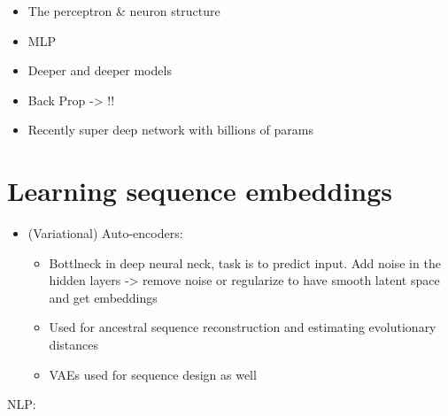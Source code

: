 \documentclass[
  11pt,
  twoside,
  BCOR=10mm,
  listof=totoc]{scrbook}
\providecommand{\tightlist}{%
  \setlength{\itemsep}{0pt}\setlength{\parskip}{0pt}}
\begin{document}
\begin{itemize}
\item
  The perceptron \& neuron structure
\item
  MLP
\item
  Deeper and deeper models
\item
  Back Prop -\textgreater{} !!
\item
  Recently super deep network with billions of params
\end{itemize}

\hypertarget{learning-sequence-embeddings}{%
\section{Learning sequence embeddings}\label{learning-sequence-embeddings}}

\begin{itemize}
\item
  (Variational) Auto-encoders:

  \begin{itemize}
  \tightlist
  \item
    Bottlneck in deep neural neck, task is to predict input. Add noise in the hidden layers -\textgreater{} remove noise or regularize to have smooth latent space and get embeddings
  \item
    Used for ancestral sequence reconstruction \autocite{moretaAncestralProteinSequence2022} and estimating evolutionary distances \autocite{corsoNeuralDistanceEmbeddings2021}
  \item
    VAEs used for sequence design as well \autocite{wuProteinSequenceDesign2021,stantonAcceleratingBayesianOptimization2022}
  \end{itemize}
\end{itemize}

NLP:
\end{document}
